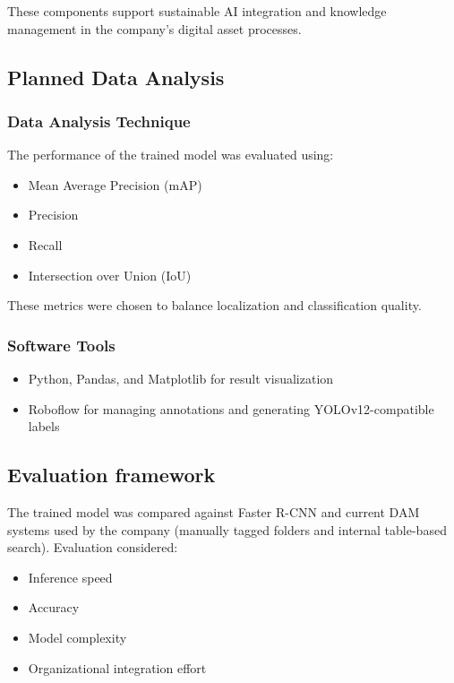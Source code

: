 \documentclass[a4paper,10pt,twocolumn]{article}
\numberwithin{figure}{section}
\numberwithin{table}{section}
\begin{document}
These components support sustainable AI integration and knowledge management in the company’s digital asset processes.


\subsection{Planned Data Analysis}

\subsubsection{Data Analysis Technique}
The performance of the trained model was evaluated using:
\begin{itemize} 
    \item Mean Average Precision (mAP)
    \item Precision
    \item Recall
    \item Intersection over Union (IoU)
\end{itemize} 
These metrics were chosen to balance 
localization and classification quality.

\subsubsection{Software Tools}

\begin{itemize} 
    \item Python, Pandas, and Matplotlib for result visualization
    \item Roboflow for managing annotations and generating YOLOv12-compatible labels
\end{itemize} 


\subsection{Evaluation framework}
The trained model was compared against 
Faster R-CNN and current DAM systems used 
by the company (manually tagged folders and 
internal table-based search). Evaluation considered:

\begin{itemize} 
    \item Inference speed
    \item Accuracy
    \item Model complexity
    \item Organizational integration effort
\end{itemize} 
\end{document}
